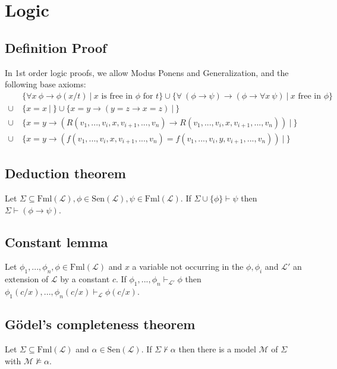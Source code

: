 \documentclass{scrartcl}
\begin{document}
\section{Logic}

\subsection*{Definition Proof}
In 1st order logic proofs, we allow Modus Ponens and Generalization, and the following base axioms:
\begin{align*}
    &\{ \forall x \ \phi \rightarrow \phi(x/t) \ | \ \text{$x$ is free in $\phi$ for $t$} \} \cup \{ \forall \ (\phi \rightarrow \psi) \rightarrow (\phi \rightarrow \forall x \ \psi) \ | \ \text{$x$ free in $\phi$}\} \\
    \cup \ & \{ x = x \ | \ \} \cup \{x = y \rightarrow (y = z \rightarrow x = z) \ | \ \} \\
    \cup \ & \{ x = y \rightarrow (R(v_1, ..., v_i, x, v_{i + 1}, ..., v_n) \rightarrow R(v_1, ..., v_i, x, v_{i + 1}, ..., v_n)) \ | \ \} \\
    \cup \ & \{ x = y \rightarrow (f(v_1, ..., v_i, x, v_{i + 1}, ..., v_n) = f(v_1, ..., v_i, y, v_{i + 1}, ..., v_n)) \ | \ \}
\end{align*}

\subsection{Deduction theorem}
Let $\Sigma \subseteq \mathrm{Fml}(\mathcal{L}), \phi \in \mathrm{Sen}(\mathcal{L}), \psi \in \mathrm{Fml}(\mathcal{L})$. If $\Sigma \cup \{\phi\} \vdash \psi$ then $\Sigma \vdash (\phi \rightarrow \psi)$.

\subsection{Constant lemma}
Let $\phi_1, ..., \phi_n, \phi \in \mathrm{Fml}(\mathcal{L})$ and $x$ a variable not occurring in the $\phi, \phi_i$ and $\mathcal{L}'$ an extension of $\mathcal{L}$ by a constant $c$. If $\phi_1, ..., \phi_n \vdash_{\mathcal{L}'} \phi$ then $\phi_1(c/x), ..., \phi_n(c/x) \vdash_{\mathcal{L}} \phi(c/x)$.

\subsection{Gödel's completeness theorem}
\label{goedel_completeness}
Let $\Sigma \subseteq \mathrm{Fml}(\mathcal{L})$ and $\alpha \in \mathrm{Sen}(\mathcal{L})$. If $\Sigma \not\vdash \alpha$ then there is a model $\mathcal{M}$ of $\Sigma$ with $\mathcal{M} \not\models \alpha$.
\end{document}

